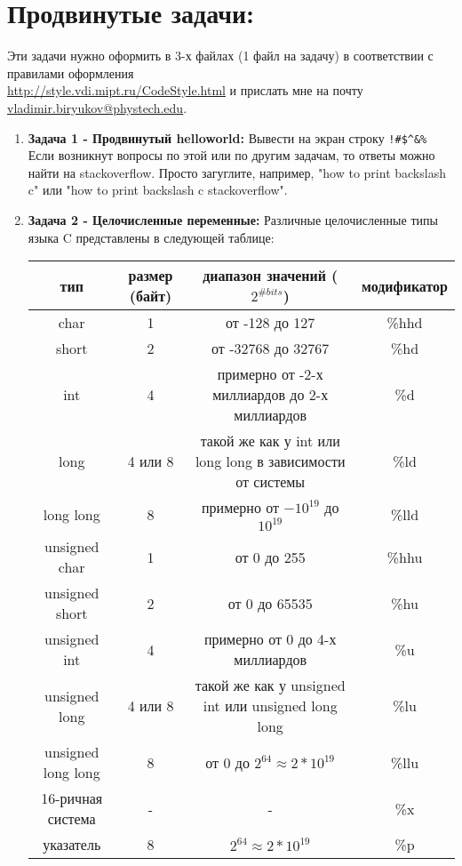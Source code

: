 \documentclass{article}
\begin{document}
\section*{Продвинутые задачи:}
Эти задачи нужно оформить в 3-х файлах (1 файл на задачу) в соответствии с правилами оформления\\ \href{http://style.vdi.mipt.ru/CodeStyle.html}{http://style.vdi.mipt.ru/CodeStyle.html} и прислать мне на почту \href{mailto:vladimir.biryukov@phystech.edu}{vladimir.biryukov@phystech.edu}.
\begin{enumerate}
\item \textbf{Задача 1 - Продвинутый helloworld:} 
Вывести на экран строку \texttt{!\textbackslash@\#\$\textasciicircum\&\%} Если возникнут вопросы по этой или по другим задачам, то ответы можно найти на stackoverflow. Просто загуглите, например, "how to print backslash c" или "how to print backslash c stackoverflow".


\item \textbf{Задача 2 - Целочисленные переменные:} Различные целочисленные типы языка C представлены в следующей таблице:

\begin{center}
\begin{tabular}{ c c c c }
 тип & размер (байт) & диапазон значений ($2^{\# bits}$) & модификатор \\ \hline
 char & 1 & от -128 до 127 & \%hhd \\ 
 short & 2 & от -32768 до 32767 & \%hd  \\  
 int & 4 & примерно от -2-х миллиардов до 2-х миллиардов & \%d  \\  
 long & 4 или 8 & такой же как у int или long long в зависимости от системы & \%ld  \\  
 long long & 8 & примерно от $-10^{19}$ до $10^{19}$ & \%lld  \\  
 unsigned char & 1 & от 0 до 255 & \%hhu \\ 
 unsigned short & 2 & от 0 до 65535 & \%hu  \\  
 unsigned int & 4 & примерно от 0 до 4-х миллиардов & \%u  \\  
 unsigned long & 4 или 8 & такой же как у unsigned int или unsigned long long & \%lu  \\  
 unsigned long long & 8 & от 0 до $2^{64} \approx 2*10^{19}$  & \%llu  \\  
 16-ричная система & - & - & \%x  \\ 
 указатель & 8 & $2^{64} \approx 2*10^{19}$ & \%p  \\  
\end{tabular}
\end{center}



\end{enumerate}
\end{document}
